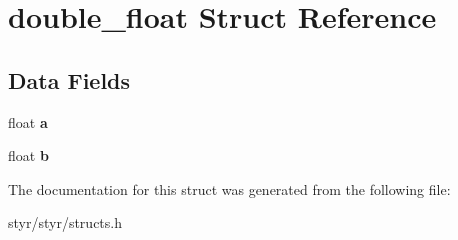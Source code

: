 \hypertarget{structdouble__float}{}\section{double\+\_\+float Struct Reference}
\label{structdouble__float}
\subsection*{Data Fields}
\begin{DoxyCompactItemize}
\item 
float {\bfseries a}\hypertarget{structdouble__float_a4aec1a5be9d9a4a394a2e49e9744286e}{}\label{structdouble__float_a4aec1a5be9d9a4a394a2e49e9744286e}

\item 
float {\bfseries b}\hypertarget{structdouble__float_a83fc1af92e29717b4513d121b0c72c7d}{}\label{structdouble__float_a83fc1af92e29717b4513d121b0c72c7d}

\end{DoxyCompactItemize}


The documentation for this struct was generated from the following file\+:\begin{DoxyCompactItemize}
\item 
styr/styr/structs.\+h\end{DoxyCompactItemize}
